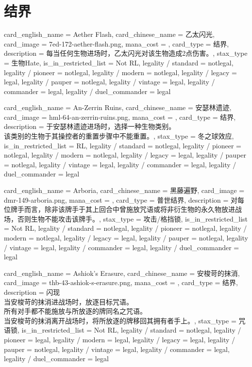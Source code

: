 \documentclass[lang = cn, color = black, 10pt]{AllThatStax}
\begin{document}
\section{结界}

\card
{
	card_english_name = {Aether Flash},
	card_chinese_name = {乙太闪光},
	card_image = 7ed-172-aether-flash.png,
	mana_cost = ,
	card_type = 结界,
	description = {每当任何生物进场时，乙太闪光对该生物造成2点伤害。},
	stax_type = 生物Hate,
	is_in_restricted_list = Not RL,
	legality / standard = notlegal,
	legality / pioneer = notlegal,
	legality / modern = notlegal,
	legality / legacy = legal,
	legality / pauper = notlegal,
	legality / vintage = legal,
	legality / commander = legal,
	legality / duel_commander = legal
}

\card
{
	card_english_name = {An-Zerrin Ruins},
	card_chinese_name = {安瑟林遗迹},
	card_image = hml-64-an-zerrin-ruins.png,
	mana_cost = ,
	card_type = 结界,
	description = {于安瑟林遗迹进场时，选择一种生物类别。\\
该类别的生物于其操控者的重置步骤中不能重置。},
	stax_type = 冬之球效应,
	is_in_restricted_list = RL,
	legality / standard = notlegal,
	legality / pioneer = notlegal,
	legality / modern = notlegal,
	legality / legacy = legal,
	legality / pauper = notlegal,
	legality / vintage = legal,
	legality / commander = legal,
	legality / duel_commander = legal
}

\card
{
	card_english_name = {Arboria},
	card_chinese_name = {黑藤遍野},
	card_image = dmr-149-arboria.png,
	mana_cost = ,
	card_type = 普世结界,
	description = {对每位牌手而言，除非该牌手于其上回合中曾施放咒语或将非衍生物的永久物放进战场，否则生物不能攻击该牌手。},
	stax_type = 攻击/格挡锁,
	is_in_restricted_list = Not RL,
	legality / standard = notlegal,
	legality / pioneer = notlegal,
	legality / modern = notlegal,
	legality / legacy = legal,
	legality / pauper = notlegal,
	legality / vintage = legal,
	legality / commander = legal,
	legality / duel_commander = legal
}

\card
{
	card_english_name = {Ashiok's Erasure},
	card_chinese_name = {安梭苛的抹消},
	card_image = thb-43-ashiok-s-erasure.png,
	mana_cost = ,
	card_type = 结界,
	description = {闪现\\
当安梭苛的抹消进战场时，放逐目标咒语。\\
所有对手都不能施放与所放逐的牌同名之咒语。\\
当安梭苛的抹消离开战场时，将所放逐的牌移回其拥有者手上。},
	stax_type = 咒语锁,
	is_in_restricted_list = Not RL,
	legality / standard = notlegal,
	legality / pioneer = legal,
	legality / modern = legal,
	legality / legacy = legal,
	legality / pauper = notlegal,
	legality / vintage = legal,
	legality / commander = legal,
	legality / duel_commander = legal
}
\end{document}
